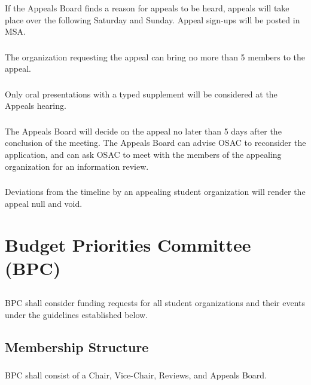 \subsubsection{}
If the Appeals Board finds a reason for appeals to be heard, appeals will take place over the following Saturday and Sunday.  Appeal sign-ups will be posted in MSA.

\subsubsection{}
The organization requesting the appeal can bring no more than 5 members to the appeal.

\subsubsection{}
Only oral presentations with a typed supplement will be considered at the Appeals hearing.

\subsubsection{}
The Appeals Board will decide on the appeal no later than 5 days after the conclusion of the meeting.  The Appeals Board can advise OSAC to reconsider the application, and can ask OSAC to meet with the members of the appealing organization for an information review.

\subsubsection{}
Deviations from the timeline by an appealing student organization will render the appeal null and void.


\section{Budget Priorities Committee (BPC)}

\subsection{}
BPC shall consider funding requests for all student organizations and their events under the guidelines established below.

\subsection{Membership Structure}
\subsubsection{}
BPC shall consist of a Chair, Vice-Chair, Reviews, and Appeals Board.

